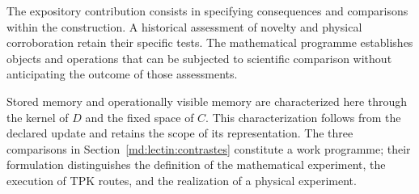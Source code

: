 The expository contribution consists in specifying consequences and
comparisons within the construction. A historical assessment of
novelty and physical corroboration retain their specific
tests. The mathematical programme establishes objects and operations
that can be subjected to scientific comparison without anticipating the
outcome of those assessments.

Stored memory and operationally visible memory are characterized
here through the kernel of $D$ and the fixed space of
$C$. This characterization follows from the declared update
and retains the scope of its representation. The three
comparisons in Section~\ref{md:lectin:contrastes} constitute a
work programme; their formulation distinguishes the definition of the
mathematical experiment, the execution of TPK routes, and the realization
of a physical experiment.
